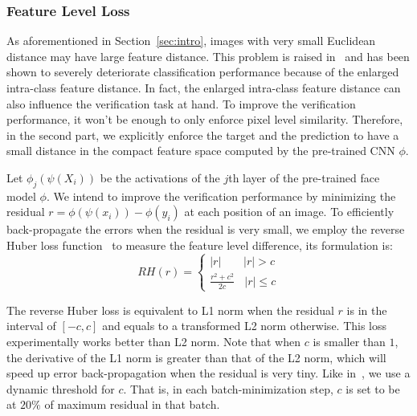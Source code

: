 \documentclass[10pt,twocolumn,letterpaper]{article}
\begin{document}
\subsubsection{Feature Level Loss} As aforementioned in Section~\ref{sec:intro}, images with very small Euclidean distance may have large feature distance. This problem is raised in~\cite{szegedy2013intriguing} and has been shown to severely deteriorate classification performance because of the enlarged intra-class feature distance. In fact, the enlarged intra-class feature distance can also influence the verification task at hand. To improve the verification performance, it won't be enough to only enforce pixel level similarity. %
Therefore, in the second part, we explicitly enforce the target and the prediction to have a small distance in the compact feature space computed by the pre-trained CNN $\phi$.

Let $\phi _j(\psi(X_i))$ be the activations of the $j$th layer of the pre-trained face model $\phi$. We intend to improve the verification performance by minimizing the residual $r = {\phi (\psi ({x_i})) - \phi ({y_i})}$ at each position of an image. To efficiently back-propagate the errors when the residual is very small, we employ the reverse Huber loss function~\cite{laina2016deeper} to measure the feature level difference, its formulation is:
\begin{equation}
RH(r) = \left\{ \begin{array}{l}
\left| r \right| \ \ \ \ \ \ \ \ \  \left| r \right| > c\\
\frac{{r^2 + c^2}}{{2c}}  \ \ \ \ \left| r \right| \le c
\end{array} \right.
\end{equation}



The reverse Huber loss is equivalent to L1 norm when the residual $r$ is in the interval of $[-c,c]$ and equals to a transformed L2 norm otherwise. This loss experimentally works better than L2 norm.
 Note that when $c$ is smaller than $1$, the derivative of the L1 norm is greater than that of the L2 norm, which will speed up error back-propagation when the residual is very tiny. Like in~\cite{laina2016deeper}, we use a dynamic threshold for $c$. That is, in each batch-minimization step, $c$ is set to be at $20\%$ of maximum residual in that batch.
\end{document}
